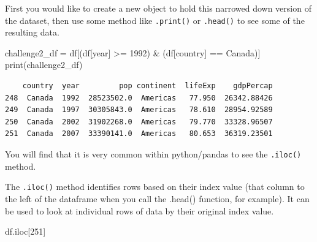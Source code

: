 \documentclass[
  letterpaper,
  DIV=11,
  numbers=noendperiod]{scrreprt}
\newenvironment{Shaded}{\begin{snugshade}}{\end{snugshade}}
\newcommand{\BuiltInTok}[1]{\textcolor[rgb]{0.00,0.23,0.31}{#1}}
\newcommand{\DecValTok}[1]{\textcolor[rgb]{0.68,0.00,0.00}{#1}}
\newcommand{\NormalTok}[1]{\textcolor[rgb]{0.00,0.23,0.31}{#1}}
\newcommand{\OperatorTok}[1]{\textcolor[rgb]{0.37,0.37,0.37}{#1}}
\newcommand{\StringTok}[1]{\textcolor[rgb]{0.13,0.47,0.30}{#1}}
\begin{document}
\begin{tcolorbox}[enhanced jigsaw, colframe=quarto-callout-note-color-frame, toprule=.15mm, colback=white, leftrule=.75mm, rightrule=.15mm, breakable, colbacktitle=quarto-callout-note-color!10!white, arc=.35mm, bottomtitle=1mm, bottomrule=.15mm, titlerule=0mm, title={Solution to Challenge 2}, toptitle=1mm, left=2mm, opacityback=0, coltitle=black, opacitybacktitle=0.6]

First you would like to create a new object to hold this narrowed down
version of the dataset, then use some method like \texttt{.print()} or
\texttt{.head()} to see some of the resulting data.

\begin{Shaded}
\begin{Highlighting}[]
\NormalTok{challenge2\_df }\OperatorTok{=}\NormalTok{ df[(df[}\StringTok{\textquotesingle{}year\textquotesingle{}}\NormalTok{] }\OperatorTok{\textgreater{}=} \DecValTok{1992}\NormalTok{) }\OperatorTok{\&}\NormalTok{ (df[}\StringTok{\textquotesingle{}country\textquotesingle{}}\NormalTok{] }\OperatorTok{==} \StringTok{\textquotesingle{}Canada\textquotesingle{}}\NormalTok{)]}
\BuiltInTok{print}\NormalTok{(challenge2\_df)}
\end{Highlighting}
\end{Shaded}

\begin{verbatim}
    country  year         pop continent  lifeExp    gdpPercap
248  Canada  1992  28523502.0  Americas   77.950  26342.88426
249  Canada  1997  30305843.0  Americas   78.610  28954.92589
250  Canada  2002  31902268.0  Americas   79.770  33328.96507
251  Canada  2007  33390141.0  Americas   80.653  36319.23501
\end{verbatim}

\end{tcolorbox}

You will find that it is very common within python/pandas to see the
\texttt{.iloc()} method.

The \texttt{.iloc()} method identifies rows based on their index value
(that column to the left of the dataframe when you call the .head()
function, for example). It can be used to look at individual rows of
data by their original index value.

\begin{Shaded}
\begin{Highlighting}[]
\NormalTok{df.iloc[}\DecValTok{251}\NormalTok{]}
\end{Highlighting}
\end{Shaded}
\end{document}

